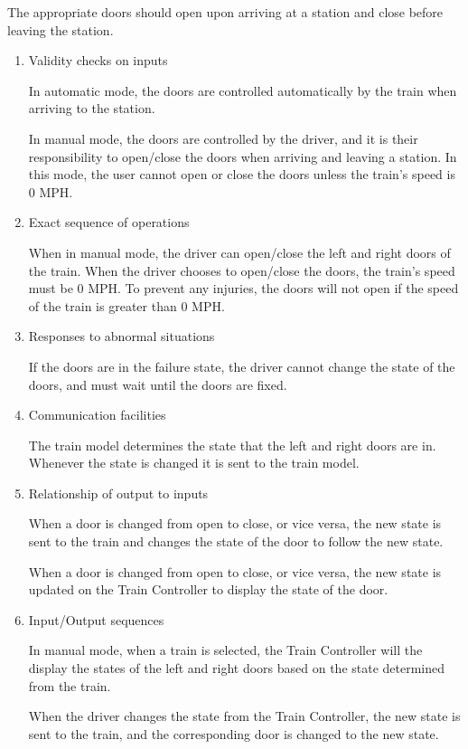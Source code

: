\documentclass[11pt]{article}
\begin{document}
\begin{enumerate}
The appropriate doors should open upon arriving at a station and close before leaving the station.
\begin{enumerate}
\item Validity checks on inputs
\label{sec-3-1-5-3-1}

In automatic mode, the doors are controlled automatically by the train when arriving to the station. 

In manual mode, the doors are controlled by the driver, and it is their responsibility to open/close the doors when arriving and leaving a station. In this mode, the user cannot open or close the doors unless the train's speed is 0 MPH. 
\item Exact sequence of operations
\label{sec-3-1-5-3-2}

When in manual mode, the driver can open/close the left and right doors of the train. When the driver chooses to open/close the doors, the train's speed must be 0 MPH. To prevent any injuries, the doors will not open if the speed of the train is greater than 0 MPH. 
\item Responses to abnormal situations
\label{sec-3-1-5-3-3}

If the doors are in the failure state, the driver cannot change the state of the doors, and must wait until the doors are fixed. 
\item Communication facilities
\label{sec-3-1-5-3-4}

The train model determines the state that the left and right doors are in. Whenever the state is changed it is sent to the train model.
\item Relationship of output to inputs
\label{sec-3-1-5-3-5}

When a door is changed from open to close, or vice versa, the new state is sent to the train and changes the state of the door to follow the new state. 

When a door is changed from open to close, or vice versa, the new state is updated on the Train Controller to display the state of the door.  
\item Input/Output sequences
\label{sec-3-1-5-3-6}

In manual mode, when a train is selected, the Train Controller will the display the states of the left and right doors based on the state determined from the train.

When the driver changes the state from the Train Controller, the new state is sent to the train, and the corresponding door is changed to the new state. 


\end{enumerate}
\end{enumerate}
\end{document}
